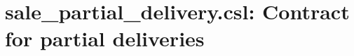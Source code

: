 \documentclass[10pt,a4paper,final,oneside,openany,article]{memoir}
\begin{document}
\newpage
\appendix
\chapter{sale\_partial\_delivery.csl: Contract for partial deliveries}
\label{chap:sale_partial_delivery}






\end{document}
